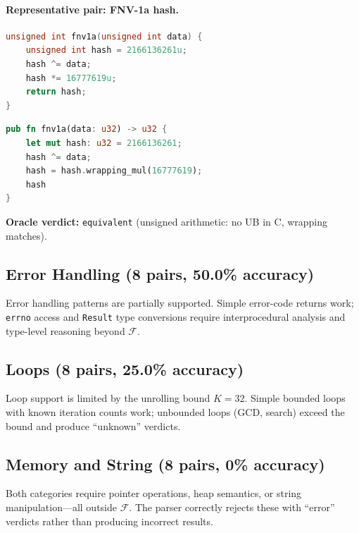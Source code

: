 \documentclass[11pt]{article}
\begin{document}
\paragraph{Representative pair: FNV-1a hash.}
\begin{lstlisting}[language=C,caption={C: FNV-1a hash (32-bit).}]
unsigned int fnv1a(unsigned int data) {
    unsigned int hash = 2166136261u;
    hash ^= data;
    hash *= 16777619u;
    return hash;
}
\end{lstlisting}

\begin{lstlisting}[language=Rust,caption={Rust: FNV-1a hash (32-bit).}]
pub fn fnv1a(data: u32) -> u32 {
    let mut hash: u32 = 2166136261;
    hash ^= data;
    hash = hash.wrapping_mul(16777619);
    hash
}
\end{lstlisting}

\noindent\textbf{Oracle verdict:} \texttt{equivalent} (unsigned arithmetic:
no UB in C, wrapping matches).

\subsection{Error Handling (8 pairs, 50.0\% accuracy)}

Error handling patterns are partially supported.  Simple error-code returns
work; \texttt{errno} access and \texttt{Result} type conversions require
interprocedural analysis and type-level reasoning beyond $\mathcal{F}$.

\subsection{Loops (8 pairs, 25.0\% accuracy)}

Loop support is limited by the unrolling bound $K = 32$.  Simple bounded
loops with known iteration counts work; unbounded loops (GCD, search)
exceed the bound and produce ``unknown'' verdicts.

\subsection{Memory and String (8 pairs, 0\% accuracy)}

Both categories require pointer operations, heap semantics, or string
manipulation---all outside $\mathcal{F}$.  The parser correctly rejects
these with ``error'' verdicts rather than producing incorrect results.

\end{document}
